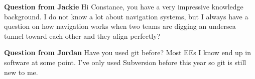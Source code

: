 \textbf{Question from Jackie}
Hi Constance, you have a very impressive knowledge background. I do not know a lot about navigation systems, but I always have a question on how navigation works when two teams are digging an undersea tunnel toward each other and they align perfectly?

\textbf{Question from Jordan}
Have you used git before? Most EEs I know end up in software at some point. I've only used Subversion before this year so git is still new to me.